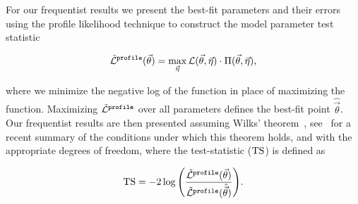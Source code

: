For our frequentist results we present the best-fit parameters and their errors using the profile likelihood technique to construct the model parameter test statistic
\begin{linenomath*}
	\begin{equation}
	\tilde{\mathcal{L}}^\texttt{profile}(\vec\theta) = \max_{\vec\eta} \mathcal{L}(\vec\theta,\vec\eta)\cdot\Pi(\vec\theta, \vec\eta),
	\label{eq:likelihood_freq}
	\end{equation}
\end{linenomath*}
where we minimize the negative log of the function in place of maximizing the function.
Maximizing $\tilde{\mathcal{L}}^\texttt{profile}$ over all parameters defines the best-fit point $\hat{\vec\theta}$.
Our frequentist results are then presented assuming Wilks' theorem~\cite{wilks1938}, see~\cite{Algeri:2019arh} for a recent summary of the conditions under which this theorem holds, and with the appropriate degrees of freedom, where the test-statistic ($\mathrm{TS}$) is defined as
\begin{linenomath*}
	\begin{equation}
	\mathrm{TS} = -2\log{\left(\frac{\tilde{\mathcal{L}}^\texttt{profile}(\vec\theta)}{\tilde{\mathcal{L}}^\texttt{profile}(\hat{\vec\theta})}\right)}.
	\end{equation}
\end{linenomath*}

